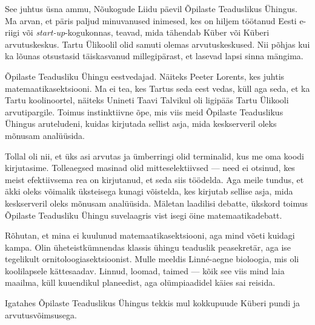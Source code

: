 

See juhtus üsna ammu, Nõukogude Liidu päevil 
Õpilaste Teaduslikus Ühingus. Ma arvan, et 
päris paljud minuvanused inimesed, kes on hiljem töötanud Eesti e-riigi või 
\emph{start-up}-kogukonnas, teavad, mida tähendab 
Küber või Küberi arvutuskeskus. Tartu 
Ülikoolil olid samuti olemas arvutuskeskused. Nii põhjas 
kui ka lõunas otsustasid täiskasvanud millegipärast, et lasevad lapsi sinna 
mängima. 


Õpilaste Teadusliku Ühingu eestvedajad. Näiteks Peeter 
Lorents, kes juhtis matemaatikasektsiooni. Ma ei tea, kes Tartus seda eest vedas, küll aga seda, et ka Tartu 
koolinoortel, näiteks Unineti Taavi Talvikul oli ligipääs Tartu Ülikooli arvutipargile. Toimus instinktiivne 
õpe, mis viis meid Õpilaste Teaduslikus Ühingus aruteludeni, 
kuidas kirjutada sellist asja, mida keskserveril oleks mõnusam analüüsida. 

Tollal oli nii, et üks asi arvutas ja ümberringi olid terminalid, kus me 
oma koodi kirjutasime. Tolleaegsed masinad olid mitteselektiivsed --- 
need ei otsinud, kes meist efektiivsema rea on kirjutanud, et seda siis 
töödelda. Aga meile tundus, et äkki oleks võimalik üksteisega kunagi 
võistelda, kes kirjutab sellise asja, mida keskserveril 
oleks mõnusam analüüsida. Mäletan laadilisi debatte, ükskord toimus
Õpilaste Teadusliku Ühingu suvelaagris vist isegi öine matemaatikadebatt. 

Rõhutan, et mina ei kuulunud matemaatikasektsiooni, aga mind võeti kuidagi 
kampa. Olin üheteistkümnendas klassis ühingu 
teaduslik peasekretär, aga ise tegelikult 
ornitoloogiasektsioonist. Mulle meeldis Linné-aegne 
bioloogia, mis oli 
koolilapsele kättesaadav. Linnud, loomad, taimed --- kõik see viis mind 
laia maailma, küll kuuendikul planeedist, aga olümpiaadidel käies
sai reisida. 

Igatahes Õpilaste Teaduslikus Ühingus tekkis mul kokkupuude Küberi pundi ja 
arvutusvõimsusega.

